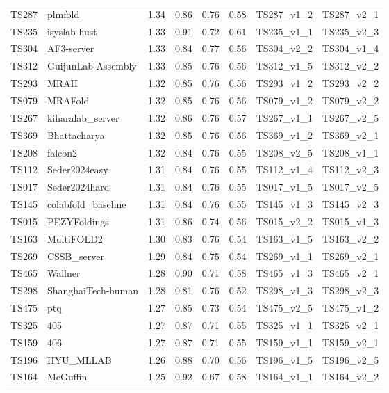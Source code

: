 \begin{longtable}{llllllll}
TS287 & plmfold & 1.34 & 0.86 & 0.76 & 0.58 & TS287\_v1\_2 & TS287\_v2\_1 \\ 
TS235 & isyslab-hust & 1.33 & 0.91 & 0.72 & 0.61 & TS235\_v1\_1 & TS235\_v2\_3 \\ 
TS304 & AF3-server & 1.33 & 0.84 & 0.77 & 0.56 & TS304\_v2\_2 & TS304\_v1\_4 \\ 
TS312 & GuijunLab-Assembly & 1.33 & 0.85 & 0.76 & 0.56 & TS312\_v1\_5 & TS312\_v2\_2 \\ 
TS293 & MRAH & 1.32 & 0.85 & 0.76 & 0.56 & TS293\_v1\_2 & TS293\_v2\_2 \\ 
TS079 & MRAFold & 1.32 & 0.85 & 0.76 & 0.56 & TS079\_v1\_2 & TS079\_v2\_2 \\ 
TS267 & kiharalab\_server & 1.32 & 0.86 & 0.76 & 0.57 & TS267\_v1\_1 & TS267\_v2\_5 \\ 
TS369 & Bhattacharya & 1.32 & 0.85 & 0.76 & 0.56 & TS369\_v1\_2 & TS369\_v2\_1 \\ 
TS208 & falcon2 & 1.32 & 0.84 & 0.76 & 0.55 & TS208\_v2\_5 & TS208\_v1\_1 \\ 
TS112 & Seder2024easy & 1.31 & 0.84 & 0.76 & 0.55 & TS112\_v1\_4 & TS112\_v2\_3 \\ 
TS017 & Seder2024hard & 1.31 & 0.84 & 0.76 & 0.55 & TS017\_v1\_5 & TS017\_v2\_5 \\ 
TS145 & colabfold\_baseline & 1.31 & 0.84 & 0.76 & 0.55 & TS145\_v1\_3 & TS145\_v2\_3 \\ 
TS015 & PEZYFoldings & 1.31 & 0.86 & 0.74 & 0.56 & TS015\_v2\_2 & TS015\_v1\_3 \\ 
TS163 & MultiFOLD2 & 1.30 & 0.83 & 0.76 & 0.54 & TS163\_v1\_5 & TS163\_v2\_2 \\ 
TS269 & CSSB\_server & 1.29 & 0.84 & 0.75 & 0.54 & TS269\_v1\_1 & TS269\_v2\_1 \\ 
TS465 & Wallner & 1.28 & 0.90 & 0.71 & 0.58 & TS465\_v1\_3 & TS465\_v2\_1 \\ 
TS298 & ShanghaiTech-human & 1.28 & 0.81 & 0.76 & 0.52 & TS298\_v1\_3 & TS298\_v2\_3 \\ 
TS475 & ptq & 1.27 & 0.85 & 0.73 & 0.54 & TS475\_v2\_5 & TS475\_v1\_2 \\ 
TS325 & 405 & 1.27 & 0.87 & 0.71 & 0.55 & TS325\_v1\_1 & TS325\_v2\_1 \\ 
TS159 & 406 & 1.27 & 0.87 & 0.71 & 0.55 & TS159\_v1\_1 & TS159\_v2\_1 \\ 
TS196 & HYU\_MLLAB & 1.26 & 0.88 & 0.70 & 0.56 & TS196\_v1\_5 & TS196\_v2\_5 \\ 
TS164 & McGuffin & 1.25 & 0.92 & 0.67 & 0.58 & TS164\_v1\_1 & TS164\_v2\_2 \\ 

\end{longtable}
